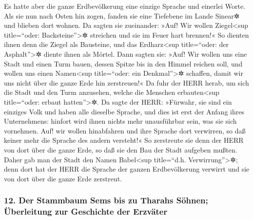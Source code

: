 Es hatte aber die ganze Erdbevölkerung eine einzige
Sprache und einerlei Worte.  Als sie nun nach Osten hin
zogen, fanden sie eine Tiefebene im Lande Sinear✲ und blieben dort
wohnen.  Da sagten sie zueinander: »Auf! Wir wollen
Ziegel\textless sup title=``oder: Backsteine''\textgreater✲ streichen
und sie im Feuer hart brennen!« So dienten ihnen denn die Ziegel als
Bausteine, und das Erdharz\textless sup title=``oder: der
Asphalt''\textgreater✲ diente ihnen als Mörtel.  Dann
sagten sie: »Auf! Wir wollen uns eine Stadt und einen Turm bauen, dessen
Spitze bis in den Himmel reichen soll, und wollen uns einen
Namen\textless sup title=``oder: ein Denkmal''\textgreater✲ schaffen,
damit wir uns nicht über die ganze Erde hin zerstreuen!« 
Da fuhr der HERR herab, um sich die Stadt und den Turm anzusehen, welche
die Menschen erbauten\textless sup title=``oder: erbaut
hatten''\textgreater✲.  Da sagte der HERR: »Fürwahr, sie
sind ein einziges Volk und haben alle dieselbe Sprache, und dies ist
erst der Anfang ihres Unternehmens: hinfort wird ihnen nichts mehr
unausführbar sein, was sie sich vornehmen.  Auf! wir
wollen hinabfahren und ihre Sprache dort verwirren, so daß keiner mehr
die Sprache des andern versteht!«  So zerstreute sie denn
der HERR von dort über die ganze Erde, so daß sie den Bau der Stadt
aufgeben mußten.  Daher gab man der Stadt den Namen
Babel\textless sup title=``d.h. Verwirrung''\textgreater✲; denn dort hat
der HERR die Sprache der ganzen Erdbevölkerung verwirrt und sie von dort
über die ganze Erde zerstreut.

\hypertarget{der-stammbaum-sems-bis-zu-tharahs-suxf6hnen-uxfcberleitung-zur-geschichte-der-erzvuxe4ter}{%
\subsubsection{12. Der Stammbaum Sems bis zu Tharahs Söhnen; Überleitung
zur Geschichte der
Erzväter}\label{der-stammbaum-sems-bis-zu-tharahs-suxf6hnen-uxfcberleitung-zur-geschichte-der-erzvuxe4ter}}

